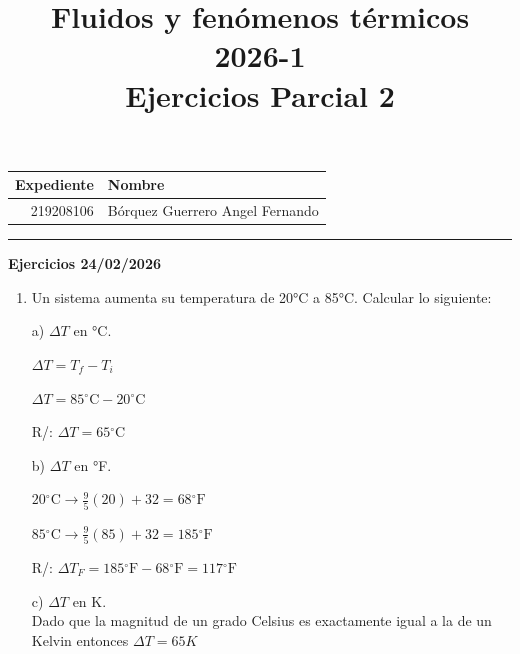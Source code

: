 \documentclass[a4paper, 11pt]{article}
\title
{
    Fluidos y fenómenos térmicos 2026-1 \\
    Ejercicios Parcial 2
}
\newcommand{\Pspace}{0.5cm}
\newcommand{\Aspace}{0.2cm}
\begin{document}
    \maketitle

    \begin{center}
        \begin{tabular}{r|l}
            \textbf{Expediente} & \textbf{Nombre} \\ \hline
            219208106 & Bórquez Guerrero Angel Fernando \\
        \end{tabular}
    \end{center}

    \rule{\linewidth}{0.3mm}

    {\Large \textbf{Ejercicios 24/02/2026}}
    \begin{enumerate}
    \vspace{\Pspace}
    \item Un sistema aumenta su temperatura de 20°C a 85°C. Calcular lo siguiente: \par
        \vspace{\Aspace} \par
        a) $\Delta T$ en °C.
        \\ { \color{azul} 
            $\Delta T = T_{f} - T_{i}$ \par
            $\Delta T = 85  \mathrm{^\circ C} - 20\mathrm{^\circ C}$ \par
            R/: $\Delta T = 65\mathrm{^\circ C}$
        }

        \vspace{\Aspace} \par
        b) $\Delta T$ en °F.
        \\ { \color{azul} 
            $20\mathrm{^\circ C} \rightarrow \frac{9}{5} (20) + 32 = 68 \mathrm{^\circ F}$ \par
            $85\mathrm{^\circ C} \rightarrow \frac{9}{5} (85) + 32 = 185\mathrm{^\circ F}$ \par
            R/: $\Delta T_{F} = 185\mathrm{^\circ F} - 68\mathrm{^\circ F} = 117\mathrm{^\circ F}$
        }

        \vspace{\Aspace} \par
        c) $\Delta T$ en K.
        \\ { \color{azul} 
            Dado que la magnitud de un grado Celsius es exactamente igual a la de un Kelvin entonces $\Delta T = 65K$
        }




\end{enumerate}
\end{document}

